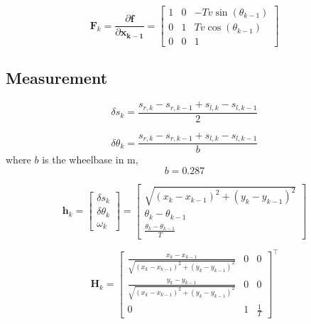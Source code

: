 \documentclass{ieeeaccess}
\begin{document}
	\begin{equation}
	\label{eq:Fsys}
		\boldsymbol{F}_{k} = \frac{\partial\boldsymbol{f}}{\partial\boldsymbol{x_{k-1}}}
		=
		\begin{bmatrix}
			1	&0	&-Tv\sin{\left(\theta_{k-1}\right)}	\\
			0	&1	&Tv\cos{\left(\theta_{k-1}\right)}	\\
			0	&0	&1
		\end{bmatrix}
	\end{equation}

\subsection{Measurement}

	\begin{equation}
	\label{eq:delts}
		\delta s_{k} = \frac{s_{r,k} - s_{r,k-1} + s_{l,k} - s_{l,k-1}}{2}
	\end{equation}
	
	\begin{equation}
	\label{eq:deltth}
		\delta \theta_{k} = \frac{s_{r,k} - s_{r,k-1} + s_{l,k} - s_{l,k-1}}{b}
	\end{equation}
	where $b$ is the wheelbase in m,
	\begin{equation}
	\label{eq:b}
		b = 0.287
	\end{equation}
	
	\begin{equation}
	\label{eq:hsys}
		\boldsymbol{h}_{ k} =
		\begin{bmatrix}
			\delta s_{k} 		\\
			\delta\theta_{k}	\\
			\omega_{k}
		\end{bmatrix}
		=
		\begin{bmatrix}
			\sqrt{\left(x_{k} - x_{k-1}\right)^{2} + \left(y_{k} - y_{k-1}\right)^{2}}	\\
			\theta_{k} - \theta_{k-1}								\\
			\frac{\theta_{k}-\theta_{k-1}}{T}
		\end{bmatrix}
	\end{equation}
	
	\begin{equation}
	\label{eq:Hsys}
		\boldsymbol{H}_{k}	=
		\begin{bmatrix}
			\frac{x_{k}-x_{k-1}}{\sqrt{\left( x_{k} - x_{k-1} \right)^{2}+\left( y_{k} - y_{k-1} \right)^{2}}}	&0	&0		\\
			\frac{y_{k}-y_{k-1}}{\sqrt{\left( x_{k} - x_{k-1} \right)^{2}+\left( y_{k} - y_{k-1} \right)^{2}}}	&0	&0		\\
			0															&1	&\frac{1}{T}
			
		\end{bmatrix}^{\top}
	\end{equation}
\end{document}
